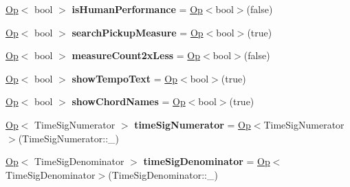 \begin{DoxyCompactItemize}
\mbox{\label{struct_ms_1_1_midi_operations_1_1_opers_affe6edaa401b1ff68ae6764f9c6097d2}} 
\hyperlink{class_ms_1_1_midi_operations_1_1_op}{Op}$<$ bool $>$ {\bfseries is\+Human\+Performance} = \hyperlink{class_ms_1_1_midi_operations_1_1_op}{Op}$<$bool$>$(false)
\item 
\mbox{\label{struct_ms_1_1_midi_operations_1_1_opers_a9705fb8435ee4d02d6a634eaaf8243f4}} 
\hyperlink{class_ms_1_1_midi_operations_1_1_op}{Op}$<$ bool $>$ {\bfseries search\+Pickup\+Measure} = \hyperlink{class_ms_1_1_midi_operations_1_1_op}{Op}$<$bool$>$(true)
\item 
\mbox{\label{struct_ms_1_1_midi_operations_1_1_opers_ada84ea80ec0b6222a8b18a1d773fb33d}} 
\hyperlink{class_ms_1_1_midi_operations_1_1_op}{Op}$<$ bool $>$ {\bfseries measure\+Count2x\+Less} = \hyperlink{class_ms_1_1_midi_operations_1_1_op}{Op}$<$bool$>$(false)
\item 
\mbox{\label{struct_ms_1_1_midi_operations_1_1_opers_a4e7e7bccb9f533c364fa70296aca7aa8}} 
\hyperlink{class_ms_1_1_midi_operations_1_1_op}{Op}$<$ bool $>$ {\bfseries show\+Tempo\+Text} = \hyperlink{class_ms_1_1_midi_operations_1_1_op}{Op}$<$bool$>$(true)
\item 
\mbox{\label{struct_ms_1_1_midi_operations_1_1_opers_a7e1993f1834065c5d6300be73d3c191a}} 
\hyperlink{class_ms_1_1_midi_operations_1_1_op}{Op}$<$ bool $>$ {\bfseries show\+Chord\+Names} = \hyperlink{class_ms_1_1_midi_operations_1_1_op}{Op}$<$bool$>$(true)
\item 
\mbox{\label{struct_ms_1_1_midi_operations_1_1_opers_ad9a99a26a0ae966c95c99ac57217a9cf}} 
\hyperlink{class_ms_1_1_midi_operations_1_1_op}{Op}$<$ Time\+Sig\+Numerator $>$ {\bfseries time\+Sig\+Numerator} = \hyperlink{class_ms_1_1_midi_operations_1_1_op}{Op}$<$Time\+Sig\+Numerator$>$(Time\+Sig\+Numerator\+::\+\_)
\item 
\mbox{\label{struct_ms_1_1_midi_operations_1_1_opers_a818f627e575f49d5188cca89c2766399}} 
\hyperlink{class_ms_1_1_midi_operations_1_1_op}{Op}$<$ Time\+Sig\+Denominator $>$ {\bfseries time\+Sig\+Denominator} = \hyperlink{class_ms_1_1_midi_operations_1_1_op}{Op}$<$Time\+Sig\+Denominator$>$(Time\+Sig\+Denominator\+::\+\_)

\end{DoxyCompactItemize}
